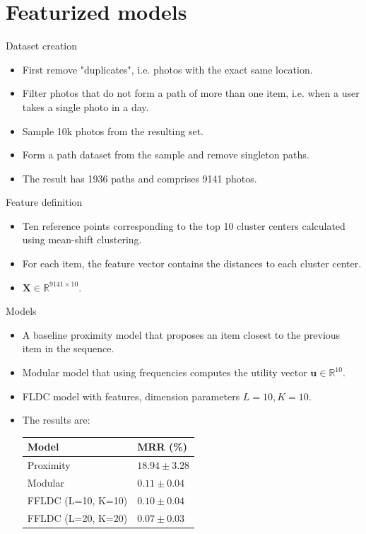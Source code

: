 \documentclass{beamer}
\begin{document}
\section{Featurized models}

\begin{frame}{Dataset creation}
  \begin{itemize}
    \item First remove "duplicates", i.e. photos with the exact same location.
    \item Filter photos that do not form a path of more than one item, i.e. when a user takes a single photo in a day.
    \item Sample 10k photos from the resulting set.
    \item Form a path dataset from the sample and remove singleton paths.
    \item The result has 1936 paths and comprises 9141 photos.
  \end{itemize}
\end{frame}

\begin{frame}{Feature definition}
  \begin{itemize}
    \item Ten reference points corresponding to the top 10 cluster centers calculated using mean-shift clustering.
    \item For each item, the feature vector contains the distances to each cluster center.
    \item $\mathbf{X} \in \mathbb{R}^{9141 \times 10}$.
  \end{itemize}
\end{frame}

\begin{frame}{Models}
  \begin{itemize}
    \item A baseline proximity model that proposes an item closest to the previous item in the sequence.
    \item Modular model that using frequencies computes the utility vector $\mathbf{u} \in \mathbb{R}^{10}$.
    \item FLDC model with features, dimension parameters $L=10, K=10$.
    \item The results are:
    
    \begin{table}
      \centering
      \begin{tabular}{@{}ll@{}}
        \hline
        \textbf{Model} & \textbf{MRR (\%)}\\
        \hline
        Proximity & $18.94 \pm 3.28$ \\
        Modular & $0.11 \pm 0.04$ \\
        FFLDC (L=10, K=10) & $0.10 \pm 0.04$ \\
        FFLDC (L=20, K=20) & $0.07 \pm 0.03$ \\
        \hline
      \end{tabular}
    \end{table}
  \end{itemize}
\end{frame}
\end{document}
